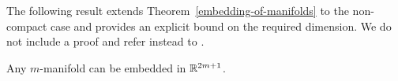 The following result extends Theorem~\ref{embedding-of-manifolds} to the non-compact case and provides an explicit bound on the required dimension. We do not include a proof and refer instead to \cite[\S 50, Exercises~6--7]{Mun}.

\begin{thm}
  Any $m$-manifold can be embedded in $\mathbb{R}^{2m+1}$.
\end{thm}
